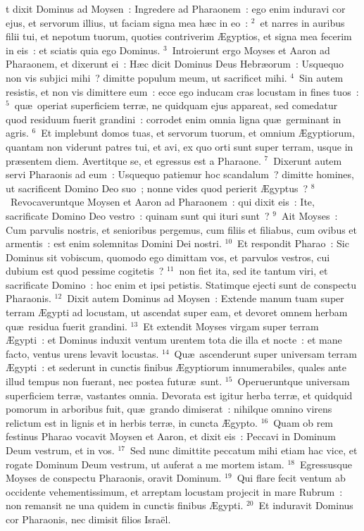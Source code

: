 \bchapter
{}t dixit Dominus ad Moysen~: Ingredere ad Pharaonem~: ego enim induravi cor ejus, et servorum illius, ut faciam signa mea h\ae c in eo~:
${}^{2}$~et narres in auribus filii tui, et nepotum tuorum, quoties contriverim \AE gyptios, et signa mea fecerim in eis~: et sciatis quia ego Dominus.
${}^{3}$~Introierunt ergo Moyses et Aaron ad Pharaonem, et dixerunt ei~: H\ae c dicit Dominus Deus Hebr\ae orum~: Usquequo non vis subjici mihi~? dimitte populum meum, ut sacrificet mihi.
${}^{4}$~Sin autem resistis, et non vis dimittere eum~: ecce ego inducam cras locustam in fines tuos~:
${}^{5}$~qu\ae\ operiat superficiem terr\ae , ne quidquam ejus appareat, sed comedatur quod residuum fuerit grandini~: corrodet enim omnia ligna qu\ae\ germinant in agris.
${}^{6}$~Et implebunt domos tuas, et servorum tuorum, et omnium \AE gyptiorum, quantam non viderunt patres tui, et avi, ex quo orti sunt super terram, usque in pr\ae sentem diem. Avertitque se, et egressus est a Pharaone.
${}^{7}$~Dixerunt autem servi Pharaonis ad eum~: Usquequo patiemur hoc scandalum~? dimitte homines, ut sacrificent Domino Deo suo~; nonne vides quod perierit \AE gyptus~?
${}^{8}$~Revocaveruntque Moysen et Aaron ad Pharaonem~: qui dixit eis~: Ite, sacrificate Domino Deo vestro~: quinam sunt qui ituri sunt~?
${}^{9}$~Ait Moyses~: Cum parvulis nostris, et senioribus pergemus, cum filiis et filiabus, cum ovibus et armentis~: est enim solemnitas Domini Dei nostri.
${}^{10}$~Et respondit Pharao~: Sic Dominus sit vobiscum, quomodo ego dimittam vos, et parvulos vestros, cui dubium est quod pessime cogitetis~?
${}^{11}$~non fiet ita, sed ite tantum viri, et sacrificate Domino~: hoc enim et ipsi petistis. Statimque ejecti sunt de conspectu Pharaonis.
${}^{12}$~Dixit autem Dominus ad Moysen~: Extende manum tuam super terram \AE gypti ad locustam, ut ascendat super eam, et devoret omnem herbam qu\ae\ residua fuerit grandini.
${}^{13}$~Et extendit Moyses virgam super terram \AE gypti~: et Dominus induxit ventum urentem tota die illa et nocte~: et mane facto, ventus urens levavit locustas.
${}^{14}$~Qu\ae\ ascenderunt super universam terram \AE gypti~: et sederunt in cunctis finibus \AE gyptiorum innumerabiles, quales ante illud tempus non fuerant, nec postea futur\ae\ sunt.
${}^{15}$~Operueruntque universam superficiem terr\ae , vastantes omnia. Devorata est igitur herba terr\ae , et quidquid pomorum in arboribus fuit, qu\ae\ grando dimiserat~: nihilque omnino virens relictum est in lignis et in herbis terr\ae , in cuncta \AE gypto.
${}^{16}$~Quam ob rem festinus Pharao vocavit Moysen et Aaron, et dixit eis~: Peccavi in Dominum Deum vestrum, et in vos.
${}^{17}$~Sed nunc dimittite peccatum mihi etiam hac vice, et rogate Dominum Deum vestrum, ut auferat a me mortem istam.
${}^{18}$~Egressusque Moyses de conspectu Pharaonis, oravit Dominum.
${}^{19}$~Qui flare fecit ventum ab occidente vehementissimum, et arreptam locustam projecit in mare Rubrum~: non remansit ne una quidem in cunctis finibus \AE gypti.
${}^{20}$~Et induravit Dominus cor Pharaonis, nec dimisit filios Isra\"el.


